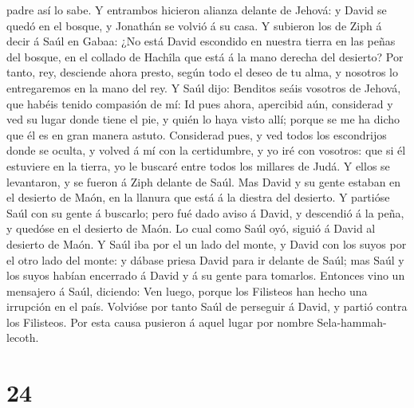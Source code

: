 padre así lo sabe.  Y entrambos hicieron alianza delante
de Jehová: y David se quedó en el bosque, y Jonathán se volvió á su
casa.  Y subieron los de Ziph á decir á Saúl en Gabaa:
¿No está David escondido en nuestra tierra en las peñas del bosque, en
el collado de Hachîla que está á la mano derecha del desierto?
 Por tanto, rey, desciende ahora presto, según todo el
deseo de tu alma, y nosotros lo entregaremos en la mano del rey.
 Y Saúl dijo: Benditos seáis vosotros de Jehová, que
habéis tenido compasión de mí:  Id pues ahora, apercibid
aún, considerad y ved su lugar donde tiene el pie, y quién lo haya visto
allí; porque se me ha dicho que él es en gran manera astuto.
 Considerad pues, y ved todos los escondrijos donde se
oculta, y volved á mí con la certidumbre, y yo iré con vosotros: que si
él estuviere en la tierra, yo le buscaré entre todos los millares de
Judá.  Y ellos se levantaron, y se fueron á Ziph delante
de Saúl. Mas David y su gente estaban en el desierto de Maón, en la
llanura que está á la diestra del desierto.  Y partióse
Saúl con su gente á buscarlo; pero fué dado aviso á David, y descendió á
la peña, y quedóse en el desierto de Maón. Lo cual como Saúl oyó, siguió
á David al desierto de Maón.  Y Saúl iba por el un lado
del monte, y David con los suyos por el otro lado del monte: y dábase
priesa David para ir delante de Saúl; mas Saúl y los suyos habían
encerrado á David y á su gente para tomarlos.  Entonces
vino un mensajero á Saúl, diciendo: Ven luego, porque los Filisteos han
hecho una irrupción en el país.  Volvióse por tanto Saúl
de perseguir á David, y partió contra los Filisteos. Por esta causa
pusieron á aquel lugar por nombre Sela-hammah-lecoth.

\hypertarget{section-23}{%
\section{24}\label{section-23}}

